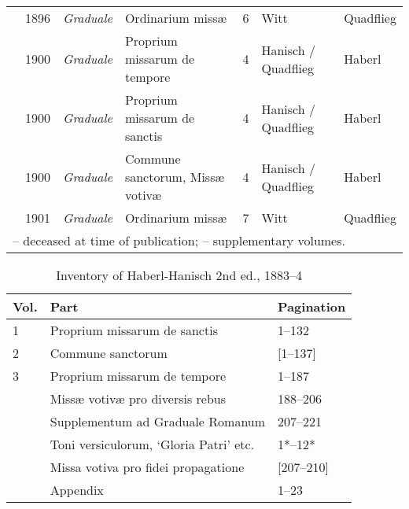 \begin{landscape}
\begin{table}[ht]
\begin{tabular}{@{}rllllll@{}}
\covid{}                    & 1896 & \textit{Graduale}  & Ordinarium missæ                                       & 6       & Witt\dagger{}                & Quadflieg          \\
                           & 1900 & \textit{Graduale}  & Proprium missarum de tempore                           & 4       & Hanisch\dagger{} / Quadflieg & Haberl             \\
                           & 1900 & \textit{Graduale}  & Proprium missarum de sanctis                           & 4       & Hanisch\dagger{} / Quadflieg & Haberl             \\
                           & 1900 & \textit{Graduale}  & Commune sanctorum, Missæ votivæ                        & 4       & Hanisch\dagger{} / Quadflieg & Haberl             \\
\covid{}                    & 1901 & \textit{Graduale}  & Ordinarium missæ                                       & 7       & Witt\dagger{}                & Quadflieg          \\ \bottomrule
\multicolumn{7}{l}{\dagger{} -- deceased at time of publication; \star{} -- supplementary volumes.}
\end{tabular}
\end{table}
\end{landscape}

  \vspace*{\fill}

  \begin{table}[ht]
  \centering
  \footnotesize
  \caption{Inventory of Haberl-Hanisch 2nd ed., 1883--4}
  \label{tab:haberlhanisch-second}
  \begin{tabular}{@{}lll@{}}
  \toprule
  Vol. & Part                                   & Pagination   \\ \midrule
  1    & Proprium missarum de sanctis           & 1--132       \\
  2    & Commune sanctorum                      & [1--137]   \\
  3    & Proprium missarum de tempore           & 1--187       \\
       & Missæ votivæ pro diversis rebus        & 188--206     \\
       & Supplementum ad Graduale Romanum       & 207--221     \\
       & Toni versiculorum, `Gloria Patri' etc. & 1*--12*      \\
       & Missa votiva pro fidei propagatione    & [207--210] \\
       & Appendix                               & 1--23        \\ \bottomrule
  \end{tabular}
  \end{table}

